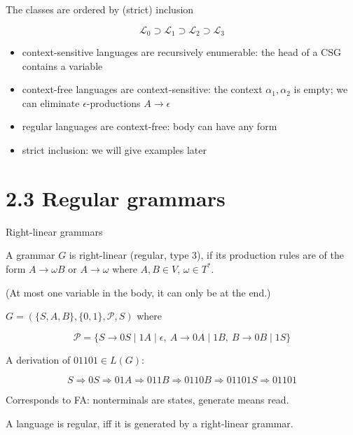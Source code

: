 \documentclass[handout]{beamer}
\begin{document}
\begin{frame}{The classes are ordered by (strict) inclusion}

	\Huge{
		$$
		{\mathcal L}_0\supset {\mathcal L}_1 \supset {\mathcal L}_2\supset {\mathcal L}_3 
		$$
	}

	\bigskip

	\normalsize{

	\begin{itemize}
		\item context-sensitive languages are recursively enumerable: the head of a CSG contains a variable

		\item context-free languages are context-sensitive: the context $\alpha_1,\alpha_2$ is empty; we can \alert{eliminate $\epsilon$-productions} $A\to\epsilon$

		\item regular languages are context-free: body can have any form 

		\item strict inclusion: we will give examples later
	\end{itemize}

	}

\end{frame}


\section{2.3 Regular grammars}

\begin{frame}{Right-linear grammars}

	A grammar $G$ is \alert{right-linear} (\alert{regular}, \alert{type 3}), if its production rules are of the form \alert{$A\to\omega B$} or \alert{$A\to\omega$} where $A,B\in V$, $\omega\in T^*$.

	(At most one variable in the body, it can only be at the end.)

	\begin{example}
		$G=(\{S,A,B\},\{0,1\},\mathcal P,S)$ where
		
		\vspace{-12pt}
		$$
		\mathcal P=\{S\rightarrow 0S\mid 1A\mid \epsilon,\ A\rightarrow 0A\mid 1B,\ B\rightarrow 0B\mid 1S\}
		$$

		\vspace{-6pt}
		A derivation of $01101\in L(G)$:

		\vspace{-24pt}
		$$
		S\Rightarrow 0S\Rightarrow 01A \Rightarrow 011B \Rightarrow 0110B \Rightarrow 01101S \Rightarrow 01101
		$$
		
		\vspace{-6pt}
	\end{example}
	Corresponds to FA: nonterminals are states, generate means read.

	\begin{theorem}
		A language is regular, iff it is generated by a right-linear grammar.
	\end{theorem}

\end{frame}
\end{document}
